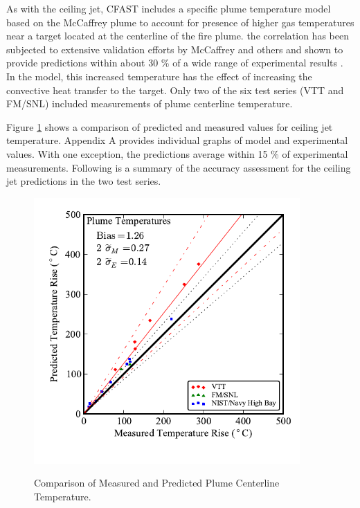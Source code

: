 As with the ceiling jet, CFAST includes a specific plume temperature model based on the McCaffrey plume \cite{Baum:1989, McCaffrey:1983} to account for presence of higher gas temperatures near a target located at the centerline of the fire plume. the correlation has been subjected to extensive validation efforts by McCaffrey \cite{Baum:1989} and others \cite{Valid:Davis_Plumes} and shown to provide predictions within about 30 \% of a wide range of experimental results \cite{Valid:Davis_Plumes}. In the model, this increased temperature has the effect of increasing the convective heat transfer to the target. Only two of the six test series (VTT and FM/SNL) included measurements of plume centerline temperature.

Figure \ref{fig:Plume_Temp_Scatter} shows a comparison of predicted and measured values for ceiling jet temperature. Appendix A provides individual graphs of model and experimental values. With one exception, the predictions average within 15 \% of experimental measurements. Following is a summary of the accuracy assessment for the ceiling jet predictions in the two test series.

\begin{figure}
\begin{center}
\includegraphics[width=4.0in]{FIGURES/ScatterPlots/Plume_Temperature}  \\
\end{center}
\caption{Comparison of Measured and Predicted Plume Centerline Temperature.} \label{fig:Plume_Temp_Scatter}
\end{figure}

